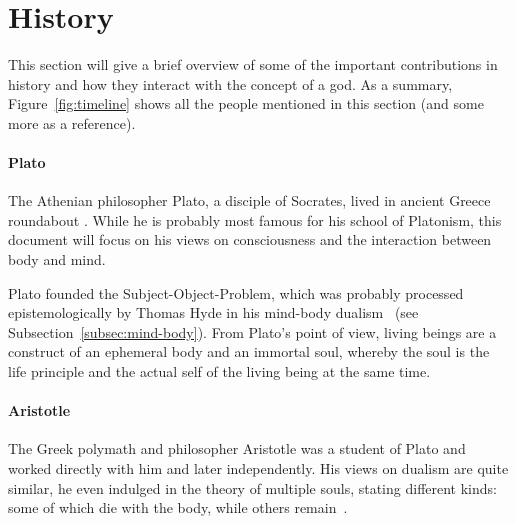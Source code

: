 \section{History}
\label{sec:History}

\begin{figure*}
    \caption[The Timeline]{Timeline of the presented persons. Those grayed out are left as a reference for other mentions in this document (photos by wikimedia~\cite{wikimedia2021}). Rounded rectangles ( and ) denote the full life span of the respective person.}
    \label{fig:timeline}
\end{figure*}

This section will give a brief overview of some of the important contributions in history and how they interact with the concept of a god.
As a summary, Figure~\ref{fig:timeline} shows all the people mentioned in this section (and some more as a reference).

\paragraph{Plato}
The Athenian philosopher Plato, a disciple of Socrates, lived in ancient Greece roundabout .
While he is probably most famous for his school of Platonism, this document will focus on his views on consciousness and the interaction between body and mind.

Plato founded the Subject-Object-Problem, which was probably processed epistemologically by Thomas Hyde in his mind-body dualism~\cite{plato360} (see Subsection~\ref{subsec:mind-body}).
From Plato's point of view, living beings are a construct of an ephemeral body and an immortal soul, whereby the soul is the life principle and the actual self of the living being at the same time.


\paragraph{Aristotle}
The Greek polymath and philosopher Aristotle was a student of Plato and worked directly with him and later independently.
His views on dualism are quite similar, he even indulged in the theory of multiple souls, stating different kinds: some of which die with the body, while others remain~\cite{aristotle350,hicks2015aristotle}.

